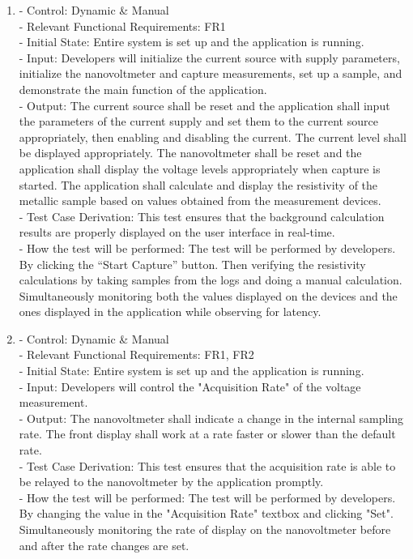\documentclass[12pt, titlepage]{article}
\begin{document}
\begin{enumerate}[{FR-T}1.]
    \item\label{T3} - Control: Dynamic \& Manual\\
    - Relevant Functional Requirements: FR1\\
    - Initial State: Entire system is set up and the application is running.\\
    - Input: Developers will initialize the current source with supply parameters, initialize the nanovoltmeter and capture measurements, set up a sample, and demonstrate the main function of the application.\\
    - Output: The current source shall be reset and the application shall input the parameters of the current supply and set them to the current source appropriately, then enabling and disabling the current. The current level shall be displayed appropriately. The nanovoltmeter shall be reset and the application shall display the voltage levels appropriately when capture is started. The application shall calculate and display the resistivity of the metallic sample based on values obtained from the measurement devices.\\
    - Test Case Derivation: This test ensures that the background calculation results are properly displayed on the user interface in real-time.\\
    - How the test will be performed: The test will be performed by developers. By clicking the “Start Capture” button. Then verifying the resistivity calculations by taking samples from the logs and doing a manual calculation. Simultaneously monitoring both the values displayed on the devices and the ones displayed in the application while observing for latency.

    \item\label{T4} - Control: Dynamic \& Manual\\
    - Relevant Functional Requirements: FR1, FR2\\
    - Initial State: Entire system is set up and the application is running.\\
    - Input: Developers will control the "Acquisition Rate" of the voltage measurement.\\
    - Output: The nanovoltmeter shall indicate a change in the internal sampling rate. The front display shall work at a rate faster or slower than the default rate.\\
    - Test Case Derivation: This test ensures that the acquisition rate is able to be relayed to the nanovoltmeter by the application promptly.\\
    - How the test will be performed: The test will be performed by developers. By changing the value in the "Acquisition Rate" textbox and clicking "Set". Simultaneously monitoring the rate of display on the nanovoltmeter before and after the rate changes are set.
    

\end{enumerate}
\end{document}
